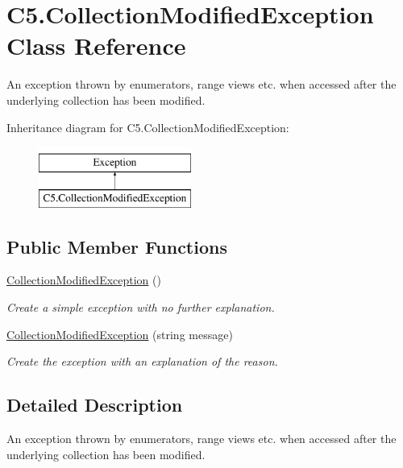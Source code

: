 \hypertarget{class_c5_1_1_collection_modified_exception}{}\section{C5.\+Collection\+Modified\+Exception Class Reference}
\label{class_c5_1_1_collection_modified_exception}


An exception thrown by enumerators, range views etc. when accessed after the underlying collection has been modified.  


Inheritance diagram for C5.\+Collection\+Modified\+Exception\+:\begin{figure}[H]
\begin{center}
\leavevmode
\includegraphics[height=2.000000cm]{class_c5_1_1_collection_modified_exception}
\end{center}
\end{figure}
\subsection*{Public Member Functions}
\begin{DoxyCompactItemize}
\item 
\hyperlink{class_c5_1_1_collection_modified_exception_af10bb3eee60db192722fb3e16c14cbc9}{Collection\+Modified\+Exception} ()
\begin{DoxyCompactList}\small\item\em Create a simple exception with no further explanation. \end{DoxyCompactList}\item 
\hyperlink{class_c5_1_1_collection_modified_exception_a891554e7e432faf411600c04f3143fe3}{Collection\+Modified\+Exception} (string message)
\begin{DoxyCompactList}\small\item\em Create the exception with an explanation of the reason. \end{DoxyCompactList}\end{DoxyCompactItemize}


\subsection{Detailed Description}
An exception thrown by enumerators, range views etc. when accessed after the underlying collection has been modified. 




